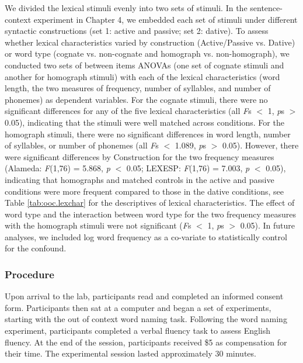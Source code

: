 We divided the lexical stimuli evenly into two sets of stimuli. In the sentence-context experiment in Chapter 4, we embedded each set of stimuli under different syntactic constructions (set 1: active and passive; set 2: dative). To assess whether lexical characteristics varied by construction (Active\slash Passive vs. Dative) or word type (cognate vs. non-cognate and homograph vs. non-homograph), we conducted two sets of between items ANOVAs (one set of cognate stimuli and another for homograph stimuli) with each of the lexical characteristics (word length, the two measures of frequency, number of syllables, and number of phonemes) as dependent variables. For the cognate stimuli, there were no significant differences for any of the five lexical characteristics (all \emph{F}s $<$ 1, \emph{p}s $>$ 0.05), indicating that the stimuli were well matched across conditions. For the homograph stimuli, there were no significant differences in word length, number of syllables, or number of phonemes (all \emph{F}s $<$ 1.089, \emph{p}s $>$ 0.05). However, there were significant differences by Construction for the two frequency measures (Alameda: \emph{F}(1,76) = 5.868, \emph{p} $<$ 0.05; LEXESP: \emph{F}(1,76) = 7.003, \emph{p} $<$ 0.05), indicating that homographs and matched controls in the active and passive conditions were more frequent compared to those in the dative conditions, see Table \ref{tab:ooc.lexchar} for the descriptives of lexical characteristics. The effect of word type and the interaction between word type for the two frequency measures with the homograph stimuli were not significant (\emph{F}s $<$ 1, \emph{p}s $>$ 0.05). In future analyses, we included log word frequency as a co-variate to statistically control for the confound. 

\subsubsection{Procedure}
\label{procedure}

Upon arrival to the lab, participants read and completed an informed consent form. Participants then sat at a computer and began a set of experiments, starting with the out of context word naming task. Following the word naming experiment, participants completed a verbal fluency task to assess English fluency. At the end of the session, participants received \$5 as compensation for their time. The experimental session lasted approximately 30 minutes.


